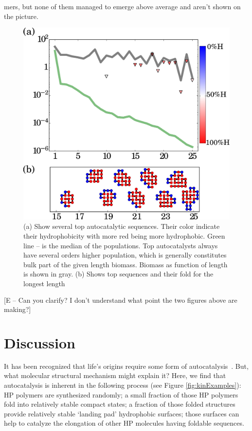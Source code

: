 \documentclass[journal=jacsat,manuscript=article,layout=twocolumn]{achemso}
\begin{document}
mers, but none of them managed to emerge above average and aren't shown on the picture.
\begin{figure}[h!]
  \centering
  \includegraphics[width=\columnwidth]{pictures/mainPlayers.pdf} 
  \caption{\footnotesize{(a) Show several top autocatalytic sequences. Their color indicate their 
hydrophobicity with more red being more hydrophobic. Green line -- is the median of the 
populations. Top autocatalysts always have several orders higher population, which is generally 
constitutes bulk part of the given length biomass. Biomass as function of length is shown in 
gray. (b) Shows top sequences and their fold for the longest length}}
  \label{fig:mainplayers}
\end{figure}

[E -- Can you clarify?  I don't understand what point the two figures above are making?]


\section{Discussion}
\label{sec:evolution}
 It has been recognized that life's origins require some form of autocatalysis~\cite{Kauffman1986,Dyson1985,Eigen1978}.  But, what molecular structural mechanism might explain it?  Here, we find that autocatalysis is inherent in the following process (see Figure \ref{fig:kinExamples}):  HP polymers 
are synthesized randomly; a small fraction of those HP polymers fold into relatively stable compact 
states; a fraction of those folded structures provide relatively stable `landing pad' hydrophobic 
surfaces; those surfaces can help to catalyze the elongation of other HP molecules having foldable 
sequences.
\end{document}
